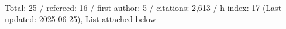 Total: 25 / refereed: 16 / first author: 5 / citations: 2,613 / h-index: 17 (Last updated: 2025-06-25), List attached below